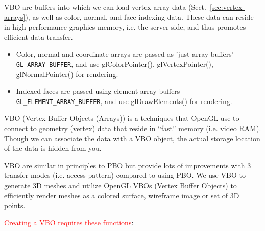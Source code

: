 VBO are buffers into which we can load vertex array data
(Sect.~\ref{sec:vertex-arrays}), as well as color, normal, and face
indexing data. These data can reside in high-performance graphics
memory, i.e. the server side, and thus promotes efficient data
transfer. 
\begin{itemize}
\item Color, normal and coordinate arrays are passed as 'just array
  buffers' \verb!GL_ARRAY_BUFFER!, and use glColorPointer(),
  glVertexPointer(), glNormalPointer() for rendering.

\item Indexed faces are passed using element array buffers
  \verb!GL_ELEMENT_ARRAY_BUFFER!, and use glDrawElements() for rendering.
\end{itemize}

\begin{framed}
  VBO (Vertex Buffer Objects (Arrays)) is a techniques that OpenGL use
  to connect to geometry (vertex) data that reside in ``fast'' memory
  (i.e. video RAM). Though we can associate the data with a VBO
  object, the actual storage location of the data is hidden from you.

  VBO are similar in principles to PBO but provide lots of
  improvements with 3 transfer modes (i.e. access pattern) compared to
  using PBO. We use VBO to generate 3D meshes and utilize OpenGL VBOs
  (Vertex Buffer Objects) to efficiently render meshes as a colored
  surface, wireframe image or set of 3D points.

\end{framed}

\textcolor{red}{Creating a VBO requires these functions}:

